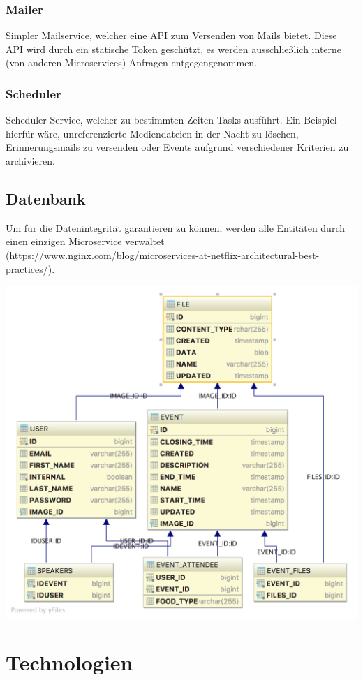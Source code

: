 \documentclass[11pt]{article} %
\begin{document}
\subsubsection{Mailer}
	Simpler Mailservice, welcher eine API zum Versenden von Mails bietet. Diese API wird durch ein statische Token geschützt, es werden ausschließlich interne (von anderen Microservices) Anfragen entgegengenommen.

\subsubsection{Scheduler}
	Scheduler Service, welcher zu bestimmten Zeiten Tasks ausführt. Ein Beispiel hierfür wäre, unreferenzierte  Mediendateien in der Nacht zu löschen, Erinnerungsmails zu versenden oder Events aufgrund verschiedener Kriterien zu archivieren.

\newpage
\subsection{Datenbank}
Um für die Datenintegrität garantieren zu können, werden alle Entitäten durch einen einzigen Microservice verwaltet (https://www.nginx.com/blog/microservices-at-netflix-architectural-best-practices/).

\includegraphics[width=1\textwidth]{dbSchema}

\newpage
\section{Technologien}
\end{document}
